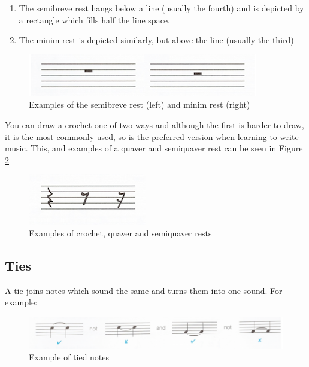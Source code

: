 \begin{enumerate}
\item The semibreve rest hangs below a line (usually the fourth) and is depicted by a rectangle which fills half the line space.
\item The minim rest is depicted similarly, but above the line (usually the third)
\end{enumerate}

\begin{figure}[h!]
  \includegraphics[width=0.7\linewidth]{gfx/basic/semibreve-minim-rest.png}
  \centering
  \caption{Examples of the semibreve rest (left) and minim rest (right)}
  \label{fig:RestMinimSemibreve}
\end{figure}

You can draw a crochet one of two ways and although the first is harder to draw, it is the most commonly used, so is the preferred version when learning to write music. This, and examples of a quaver and semiquaver rest can be seen in Figure \cref{fig:RestCrochetQS}

\begin{figure}[h!]
  \includegraphics[width=0.5\linewidth]{gfx/basic/rests.png}
  \centering
  \caption{Examples of crochet, quaver and semiquaver rests}
  \label{fig:RestCrochetQS}
\end{figure}

\subsection {Ties}

A tie joins notes which sound the same and turns them into one sound. For example:

\begin{figure}[h!]
  \includegraphics[width=\linewidth]{gfx/basic/ties.png}
  \centering
  \caption{Example of tied notes}
  \label{fig:TiedNotes}
\end{figure}

